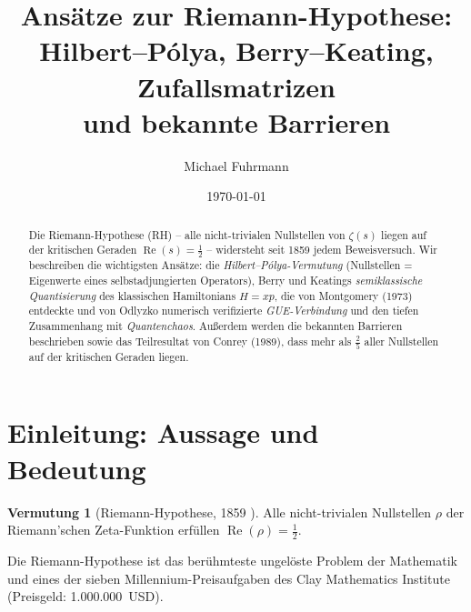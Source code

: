 \documentclass[12pt,a4paper]{amsart}
\theoremstyle{definition}
\newtheorem{conjecture}[theorem]{Vermutung}
\DeclareMathOperator{\Re}{Re}
\begin{document}

\title{Ans\"atze zur Riemann-Hypothese:\\
       Hilbert--P\'olya, Berry--Keating, Zufallsmatrizen\\
       und bekannte Barrieren}

\author{Michael Fuhrmann}
\address{Specialist Mathematics Project, Build 84}
\date{\today}

\begin{abstract}
Die Riemann-Hypothese (RH) -- alle nicht-trivialen Nullstellen von $\zeta(s)$
liegen auf der kritischen Geraden $\Re(s) = \tfrac{1}{2}$ -- widersteht
seit 1859 jedem Beweisversuch.
Wir beschreiben die wichtigsten Ans\"atze:
die \emph{Hilbert--P\'olya-Vermutung} (Nullstellen = Eigenwerte eines
selbstadjungierten Operators),
Berry und Keatings \emph{semiklassische Quantisierung} des klassischen
Hamiltonians $H = xp$,
die von Montgomery (1973) entdeckte und von Odlyzko numerisch verifi\-zierte
\emph{GUE-Verbindung} und den tiefen Zusammenhang mit
\emph{Quantenchaos}.
Au\ss erdem werden die bekannten Barrieren beschrieben sowie das
Teilresultat von Conrey (1989), dass mehr als $\tfrac{2}{5}$ aller
Nullstellen auf der kritischen Geraden liegen.
\end{abstract}

\maketitle
\tableofcontents

\section{Einleitung: Aussage und Bedeutung}

\begin{conjecture}[Riemann-Hypothese, 1859 \cite{Riemann1859}]
\label{conj:rh}
Alle nicht-trivialen Nullstellen $\rho$ der Riemann'schen Zeta-Funktion
erf\"ullen $\Re(\rho) = \tfrac{1}{2}$.
\end{conjecture}

Die Riemann-Hypothese ist das ber\"uhmteste ungel\"oste Problem der Mathematik
und eines der sieben Millennium-Preisaufgaben des Clay Mathematics Institute
(Preisgeld: 1.000.000~USD).
\end{document}
